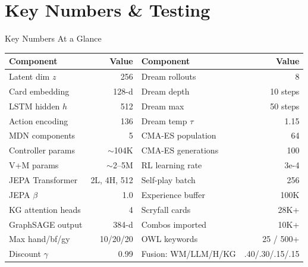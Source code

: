 \documentclass[aspectratio=169, 10pt]{beamer}
\begin{document}
\section{Key Numbers \& Testing}

\begin{frame}{Key Numbers At a Glance}
  \begin{center}
  \begin{tabular}{@{}lr@{\quad}lr@{}}
    \toprule
    \textbf{Component} & \textbf{Value} & \textbf{Component} & \textbf{Value} \\
    \midrule
    Latent dim $z$       & 256        & Dream rollouts        & 8 \\
    Card embedding       & 128-d      & Dream depth           & 10 steps \\
    LSTM hidden $h$      & 512        & Dream max             & 50 steps \\
    Action encoding      & 136        & Dream temp $\tau$     & 1.15 \\
    MDN components       & 5          & CMA-ES population     & 64 \\
    Controller params    & $\sim$104K & CMA-ES generations    & 100 \\
    V+M params           & $\sim$2--5M & RL learning rate     & 3e-4 \\
    JEPA Transformer     & 2L, 4H, 512 & Self-play batch     & 256 \\
    JEPA $\beta$         & 1.0        & Experience buffer     & 100K \\
    KG attention heads   & 4          & Scryfall cards        & 28K+ \\
    GraphSAGE output     & 384-d      & Combos imported       & 10K+ \\
    Max hand/bf/gy       & 10/20/20   & OWL keywords          & 25 / 500+ \\
    Discount $\gamma$    & 0.99       & Fusion: WM/LLM/H/KG  & .40/.30/.15/.15 \\
    \bottomrule
  \end{tabular}
  \end{center}
\end{frame}
\end{document}
